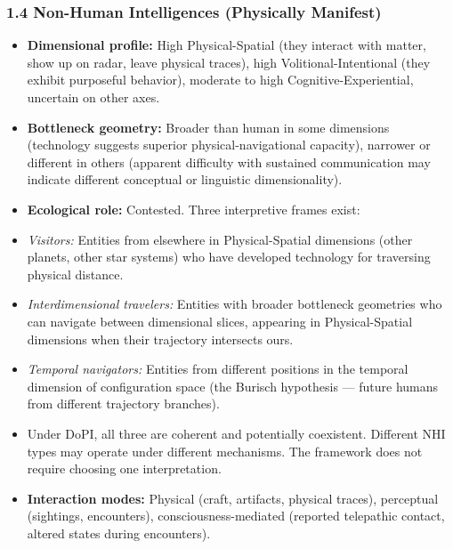 \subsubsection*{1.4 Non-Human Intelligences (Physically Manifest)}

\begin{itemize}[nosep,leftmargin=*]
  \item \textbf{Dimensional profile:} High Physical-Spatial (they interact with matter, show up on radar, leave physical traces), high Volitional-Intentional (they exhibit purposeful behavior), moderate to high Cognitive-Experiential, uncertain on other axes.
  \item \textbf{Bottleneck geometry:} Broader than human in some dimensions (technology suggests superior physical-navigational capacity), narrower or different in others (apparent difficulty with sustained communication may indicate different conceptual or linguistic dimensionality).
  \item \textbf{Ecological role:} Contested. Three interpretive frames exist:
  \item \textit{Visitors:} Entities from elsewhere in Physical-Spatial dimensions (other planets, other star systems) who have developed technology for traversing physical distance.
  \item \textit{Interdimensional travelers:} Entities with broader bottleneck geometries who can navigate between dimensional slices, appearing in Physical-Spatial dimensions when their trajectory intersects ours.
  \item \textit{Temporal navigators:} Entities from different positions in the temporal dimension of configuration space (the Burisch hypothesis — future humans from different trajectory branches).
  \item Under DoPI, all three are coherent and potentially coexistent. Different NHI types may operate under different mechanisms. The framework does not require choosing one interpretation.
  \item \textbf{Interaction modes:} Physical (craft, artifacts, physical traces), perceptual (sightings, encounters), consciousness-mediated (reported telepathic contact, altered states during encounters).

\end{itemize}
